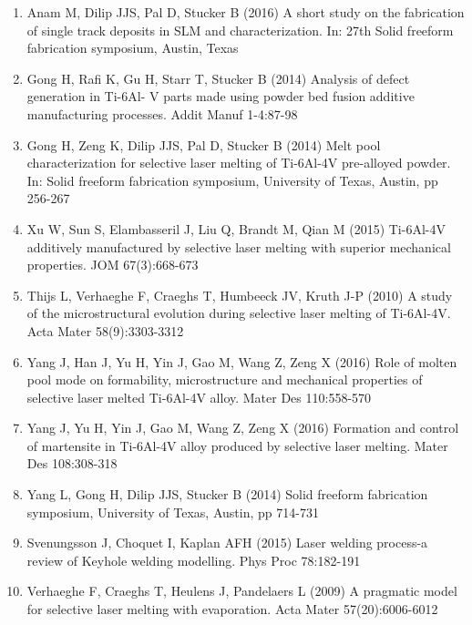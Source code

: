 \documentclass[10pt]{article}
\begin{document}
\begin{enumerate}
  \item Anam M, Dilip JJS, Pal D, Stucker B (2016) A short study on the fabrication of single track deposits in SLM and characterization. In: 27th Solid freeform fabrication symposium, Austin, Texas

  \item Gong H, Rafi K, Gu H, Starr T, Stucker B (2014) Analysis of defect generation in Ti-6Al- $\mathrm{V}$ parts made using powder bed fusion additive manufacturing processes. Addit Manuf 1-4:87-98

  \item Gong H, Zeng K, Dilip JJS, Pal D, Stucker B (2014) Melt pool characterization for selective laser melting of Ti-6Al-4V pre-alloyed powder. In: Solid freeform fabrication symposium, University of Texas, Austin, pp 256-267

  \item Xu W, Sun S, Elambasseril J, Liu Q, Brandt M, Qian M (2015) Ti-6Al-4V additively manufactured by selective laser melting with superior mechanical properties. JOM 67(3):668-673

  \item Thijs L, Verhaeghe F, Craeghs T, Humbeeck JV, Kruth J-P (2010) A study of the microstructural evolution during selective laser melting of Ti-6Al-4V. Acta Mater 58(9):3303-3312

  \item Yang J, Han J, Yu H, Yin J, Gao M, Wang Z, Zeng X (2016) Role of molten pool mode on formability, microstructure and mechanical properties of selective laser melted Ti-6Al-4V alloy. Mater Des 110:558-570

  \item Yang J, Yu H, Yin J, Gao M, Wang Z, Zeng X (2016) Formation and control of martensite in Ti-6Al-4V alloy produced by selective laser melting. Mater Des 108:308-318

  \item Yang L, Gong H, Dilip JJS, Stucker B (2014) Solid freeform fabrication symposium, University of Texas, Austin, pp 714-731

  \item Svenungsson J, Choquet I, Kaplan AFH (2015) Laser welding process-a review of Keyhole welding modelling. Phys Proc 78:182-191

  \item Verhaeghe F, Craeghs T, Heulens J, Pandelaers L (2009) A pragmatic model for selective laser melting with evaporation. Acta Mater 57(20):6006-6012


\end{enumerate}
\end{document}
